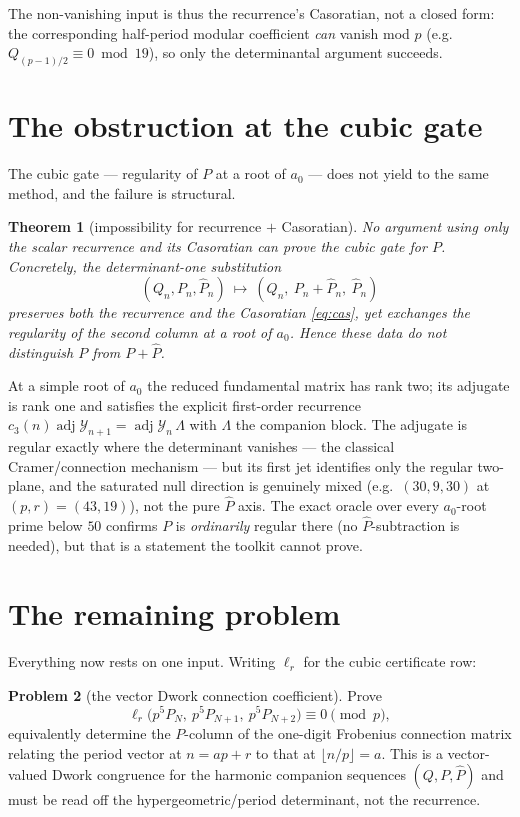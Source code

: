 \documentclass[11pt]{article}
\newtheorem{theorem}{Theorem}
\theoremstyle{definition}
\newtheorem{problem}[theorem]{Problem}
\DeclareMathOperator{\adj}{adj}
\newcommand{\Ph}{\widehat{P}}
\begin{document}
The non-vanishing input is thus the recurrence's Casoratian, not a closed form:
the corresponding half-period modular coefficient \emph{can} vanish mod $p$
(e.g.\ $Q_{(p-1)/2}\equiv 0 \bmod 19$), so only the determinantal argument
succeeds.

\section{The obstruction at the cubic gate}

The cubic gate --- regularity of $P$ at a root of $a_0$ --- does not yield to
the same method, and the failure is structural.

\begin{theorem}[impossibility for recurrence $+$ Casoratian]\label{thm:imposs}
No argument using only the scalar recurrence and its Casoratian can prove the
cubic gate for $P$. Concretely, the determinant-one substitution
\[
(Q_n, P_n, \Ph_n)\ \longmapsto\ (Q_n,\ P_n + \Ph_n,\ \Ph_n)
\]
preserves both the recurrence and the Casoratian \eqref{eq:cas}, yet exchanges
the regularity of the second column at a root of $a_0$. Hence these data do
not distinguish $P$ from $P+\Ph$.
\end{theorem}

At a simple root of $a_0$ the reduced fundamental matrix has rank two; its
adjugate is rank one and satisfies the explicit first-order recurrence
$c_3(n)\adj\mathcal Y_{n+1} = \adj\mathcal Y_n\,\Lambda$ with $\Lambda$ the
companion block. The adjugate is regular exactly where the determinant
vanishes --- the classical Cramer/connection mechanism --- but its first jet
identifies only the regular two-plane, and the saturated null direction is
genuinely mixed (e.g.\ $(30,9,30)$ at $(p,r)=(43,19)$), not the pure $\Ph$
axis. The exact oracle over every $a_0$-root prime below $50$ confirms $P$ is
\emph{ordinarily} regular there (no $\Ph$-subtraction is needed), but that is
a statement the toolkit cannot prove.

\section{The remaining problem}

Everything now rests on one input. Writing $\ell_r$ for the cubic certificate
row:

\begin{problem}[the vector Dwork connection coefficient]\label{prob:conn}
Prove
\[
\ell_r\bigl(p^5 P_N,\ p^5 P_{N+1},\ p^5 P_{N+2}\bigr) \equiv 0 \pmod p,
\]
equivalently determine the $P$-column of the one-digit Frobenius connection
matrix relating the period vector at $n = ap+r$ to that at $\lfloor n/p\rfloor
= a$. This is a vector-valued Dwork congruence for the harmonic companion
sequences $(Q,P,\Ph)$ and must be read off the hypergeometric/period
determinant, not the recurrence.
\end{problem}
\end{document}
